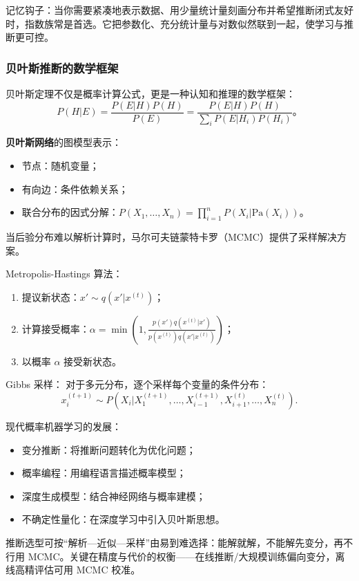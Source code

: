 记忆钩子：当你需要紧凑地表示数据、用少量统计量刻画分布并希望推断闭式友好时，指数族常是首选。它把参数化、充分统计量与对数似然联到一起，使学习与推断更可控。

\subsubsection{贝叶斯推断的数学框架}

贝叶斯定理不仅是概率计算公式，更是一种认知和推理的数学框架：
$$
P(H|E) = \frac{P(E|H)P(H)}{P(E)} = \frac{P(E|H)P(H)}{\sum_i P(E|H_i)P(H_i)}。
$$

\textbf{贝叶斯网络}的图模型表示：
\begin{itemize}
  \item 节点：随机变量；
  \item 有向边：条件依赖关系；
  \item 联合分布的因式分解：$P(X_1, \ldots, X_n) = \prod_{i=1}^n P(X_i|\text{Pa}(X_i))$。
\end{itemize}

当后验分布难以解析计算时，马尔可夫链蒙特卡罗（MCMC）提供了采样解决方案。

Metropolis-Hastings 算法：
\begin{enumerate}
  \item 提议新状态：$x' \sim q(x'|x^{(t)})$；
  \item 计算接受概率：$\alpha = \min\left(1, \frac{p(x')q(x^{(t)}|x')}{p(x^{(t)})q(x'|x^{(t)})}\right)$；
  \item 以概率 $\alpha$ 接受新状态。
\end{enumerate}

Gibbs 采样：
对于多元分布，逐个采样每个变量的条件分布：
$$
x_i^{(t+1)} \sim P(X_i|X_1^{(t+1)}, \ldots, X_{i-1}^{(t+1)}, X_{i+1}^{(t)}, \ldots, X_n^{(t)}).
$$

现代概率机器学习的发展：
\begin{itemize}
  \item 变分推断：将推断问题转化为优化问题；
  \item 概率编程：用编程语言描述概率模型；
  \item 深度生成模型：结合神经网络与概率建模；
  \item 不确定性量化：在深度学习中引入贝叶斯思想。
\end{itemize}

推断选型可按“解析—近似—采样”由易到难选择：能解就解，不能解先变分，再不行用 MCMC。关键在精度与代价的权衡——在线推断/大规模训练偏向变分，离线高精评估可用 MCMC 校准。


